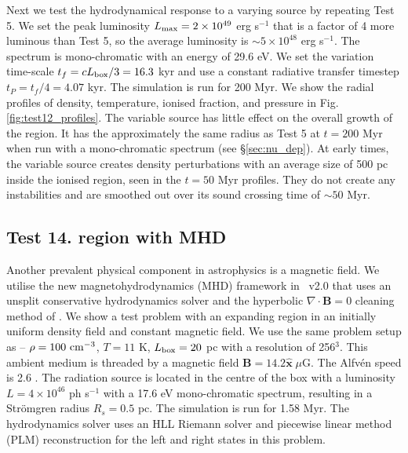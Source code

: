 \documentclass[useAMS,usenatbib]{mn2e}
\begin{document}
Next we test the hydrodynamical response to a varying source by
repeating Test 5.  We set the peak luminosity $L_{\rm max} = 2 \times
10^{49}$ erg s$^{-1}$ that is a factor of 4 more luminous than Test 5,
so the average luminosity is $\sim 5 \times 10^{48}$ erg s$^{-1}$.
The spectrum is mono-chromatic with an energy of 29.6 eV.  We set the
variation time-scale $t_f = cL_{\rm box}/3 = 16.3$ kyr and use a
constant radiative transfer timestep $t_P = t_f/4 = 4.07$ kyr.  The
simulation is run for 200 Myr.  We show the radial profiles of
density, temperature, ionised fraction, and pressure in Fig.
\ref{fig:test12_profiles}.  The variable source has little effect on
the overall growth of the \hii region.  It has the approximately
the same radius as Test 5 at $t = 200$ Myr when run with a
mono-chromatic spectrum (see \S\ref{sec:nu_dep}).  At early times, the
variable source creates density perturbations with an average size of
500 pc inside the ionised region, seen in the $t = 50$ Myr profiles.
They do not create any instabilities and are smoothed out over its
sound crossing time of $\sim 50$ Myr.

\subsection{Test 14. \hii region with MHD}

Another prevalent physical component in astrophysics is a magnetic
field.  We utilise the new magnetohydrodynamics (MHD) framework
\citep{Wang09} in \enzo~v2.0 that uses an unsplit conservative
hydrodynamics solver and the hyperbolic $\nabla \cdot \mathbf{B} = 0$
cleaning method of \citet{Dedner02}.  We show a test problem with an
expanding \hii region in an initially uniform density field and
constant magnetic field.  We use the same problem setup as
\citet{Krumholz07_ART} -- $\rho = 100~\cubecm$, $T = 11$ K, $L_{\rm
  box} = 20$ pc with a resolution of 256$^3$.  This ambient medium is
threaded by a magnetic field $\mathbf{B} = 14.2 \hat{\mathbf{x}} \;
\mu\mathrm{G}$.  The Alfv\'{e}n speed is 2.6 \kms.  The radiation
source is located in the centre of the box with a luminosity $L = 4
\times 10^{46}$ ph s$^{-1}$ with a 17.6 eV mono-chromatic spectrum,
resulting in a Str\"{o}mgren radius $R_s = 0.5$ pc.  The simulation is
run for 1.58 Myr.  The hydrodynamics solver uses an HLL Riemann solver
\citep{HLL} and piecewise linear method (PLM) reconstruction
\citep{PLM} for the left and right states in this problem.
\end{document}
